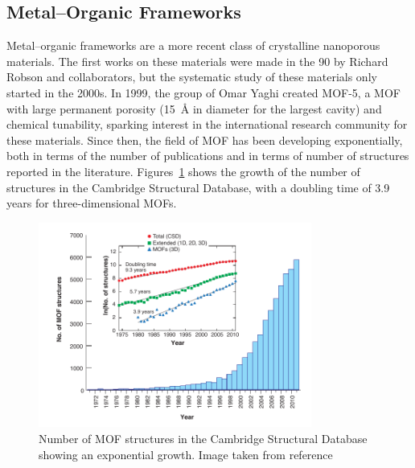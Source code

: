 \documentclass[thesis]{subfiles}
\begin{document}
\newpage
\subsection{Metal--Organic Frameworks}

Metal--organic frameworks are a more recent class of crystalline nanoporous
materials. The first works on these materials were made in the 90 by Richard
Robson and collaborators\cite{Abrahams1991, Robson2008}, but the systematic
study of these materials only started in the 2000s. In 1999, the group of Omar
Yaghi created MOF-5\cite{Li1999}, a MOF with large permanent porosity
(\SI{15}{\AA} in diameter for the largest cavity) and chemical tunability,
sparking interest in the international research community for these materials.
Since then, the field of MOF has been developing exponentially, both in terms of
the number of publications and in terms of number of structures reported in the
literature. Figures~\ref{fig:number-of-mofs} shows the growth of the number of
structures in the Cambridge Structural Database, with a doubling time of 3.9
years for three-dimensional MOFs.

\begin{figure}[ht]
    \centering
    \includegraphics[width=0.8\textwidth]{figures/cited/number-of-mofs}
    \caption{Number of MOF structures in the Cambridge Structural Database
    showing an exponential growth. Image taken from reference~\cite{Furukawa2013}}
    \label{fig:number-of-mofs}
\end{figure}
\end{document}
